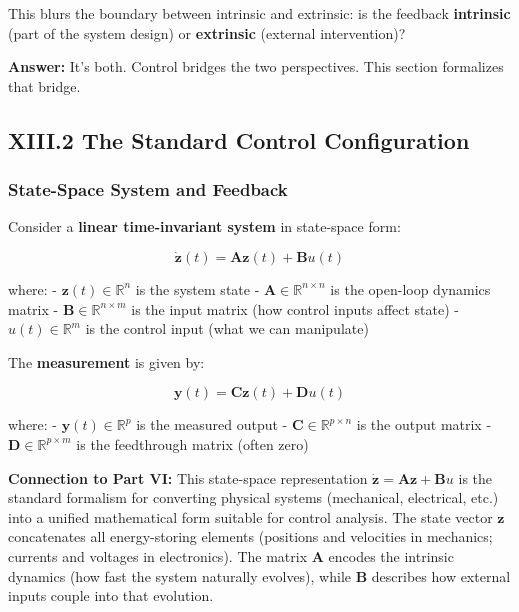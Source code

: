 \documentclass[
]{article}
\begin{document}
This blurs the boundary between intrinsic and extrinsic: is the feedback
\textbf{intrinsic} (part of the system design) or \textbf{extrinsic}
(external intervention)?

\textbf{Answer:} It's both. Control bridges the two perspectives. This
section formalizes that bridge.

\subsection{XIII.2 The Standard Control
Configuration}\label{xiii.2-the-standard-control-configuration}

\subsubsection{State-Space System and
Feedback}\label{state-space-system-and-feedback}

Consider a \textbf{linear time-invariant system} in state-space form:

\[\dot{\mathbf{z}}(t) = \mathbf{A}\mathbf{z}(t) + \mathbf{B}u(t)\]

where: - \(\mathbf{z}(t) \in \mathbb{R}^n\) is the system state -
\(\mathbf{A} \in \mathbb{R}^{n \times n}\) is the open-loop dynamics
matrix - \(\mathbf{B} \in \mathbb{R}^{n \times m}\) is the input matrix
(how control inputs affect state) - \(u(t) \in \mathbb{R}^m\) is the
control input (what we can manipulate)

The \textbf{measurement} is given by:

\[\mathbf{y}(t) = \mathbf{C}\mathbf{z}(t) + \mathbf{D}u(t)\]

where: - \(\mathbf{y}(t) \in \mathbb{R}^p\) is the measured output -
\(\mathbf{C} \in \mathbb{R}^{p \times n}\) is the output matrix -
\(\mathbf{D} \in \mathbb{R}^{p \times m}\) is the feedthrough matrix
(often zero)

\textbf{Connection to Part VI:} This state-space representation
\(\dot{\mathbf{z}} = \mathbf{A}\mathbf{z} + \mathbf{B}u\) is the
standard formalism for converting physical systems (mechanical,
electrical, etc.) into a unified mathematical form suitable for control
analysis. The state vector \(\mathbf{z}\) concatenates all
energy-storing elements (positions and velocities in mechanics; currents
and voltages in electronics). The matrix \(\mathbf{A}\) encodes the
intrinsic dynamics (how fast the system naturally evolves), while
\(\mathbf{B}\) describes how external inputs couple into that evolution.
\end{document}
